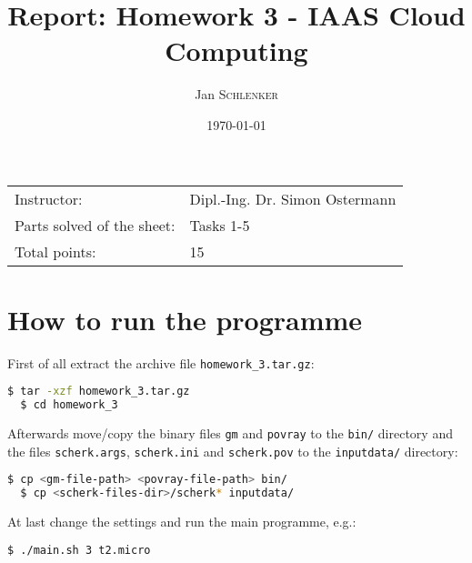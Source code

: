 \documentclass{article}
\title{Report: Homework 3 - IAAS Cloud Computing}%
\author{Jan \textsc{Schlenker}} %
\date{\today} %
\begin{document}
\maketitle %

\begin{center}
\begin{tabular}{l l}
Instructor: & Dipl.-Ing. Dr. Simon Ostermann \\
Parts solved of the sheet: & Tasks 1-5 \\
Total points: & 15
\end{tabular}
\end{center}



\section{How to run the programme}

First of all extract the archive file \texttt{homework\_3.tar.gz}:

\begin{lstlisting}[language=bash, deletekeywords={cd}]
  $ tar -xzf homework_3.tar.gz
  $ cd homework_3
\end{lstlisting}

Afterwards move/copy the binary files \texttt{gm} and \texttt{povray} to the \texttt{bin/} directory and the files \texttt{scherk.args}, \texttt{scherk.ini} and \texttt{scherk.pov} to the \texttt{inputdata/} directory:

\begin{lstlisting}[language=bash]
  $ cp <gm-file-path> <povray-file-path> bin/
  $ cp <scherk-files-dir>/scherk* inputdata/
\end{lstlisting}

At last change the settings and run the main programme, e.g.:

\begin{lstlisting}[language=bash]
  $ ./main.sh 3 t2.micro
\end{lstlisting}

\end{document}
